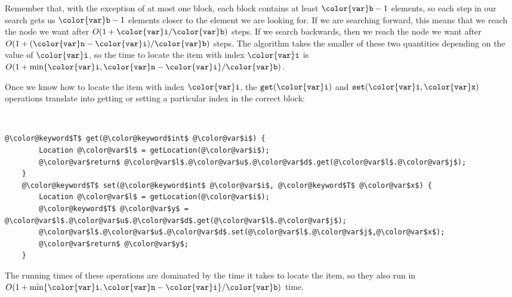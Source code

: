 \documentclass[10pt]{book}
\theoremstyle{plain}
\theoremstyle{definition}
\begin{document}
Remember that, with the exception of at most one block, each block
contains at least $\ensuremath{\mathtt{{\color{var}b}}}-1$ elements, so each step in our search gets
us $\ensuremath{\mathtt{{\color{var}b}}}-1$ elements closer to the element we are looking for.  If we
are searching forward, this means that we reach the node we want after
$O(1+\ensuremath{\mathtt{{\color{var}i}}}/\ensuremath{\mathtt{{\color{var}b}}})$ steps.  If we search backwards, then we reach the node we
want after $O(1+(\ensuremath{\mathtt{{\color{var}n}}}-\ensuremath{\mathtt{{\color{var}i}}})/\ensuremath{\mathtt{{\color{var}b}}})$ steps.  The algorithm takes the smaller
of these two quantities depending on the value of \ensuremath{\mathtt{{\color{var}i}}}, so the time to
locate the item with index \ensuremath{\mathtt{{\color{var}i}}} is $O(1+\min\{\ensuremath{\mathtt{{\color{var}i}}},\ensuremath{\mathtt{{\color{var}n}}}-\ensuremath{\mathtt{{\color{var}i}}}\}/\ensuremath{\mathtt{{\color{var}b}}})$.

Once we know how to locate the item with index \ensuremath{\mathtt{{\color{var}i}}}, the \ensuremath{\mathtt{get({\color{var}i})}} and
\ensuremath{\mathtt{set({\color{var}i},{\color{var}x})}} operations translate into getting or setting a particular
index in the correct block:



 \ \vspace{.5ex}\begin{Verbatim}[gobble=1,tabsize=2,frame=single,framerule=1.2pt,commandchars=\\@\$,label=\texttt{SEList},labelposition=topline]
	@\color@keyword$T$ get(@\color@keyword$int$ @\color@var$i$) {
		Location @\color@var$l$ = getLocation(@\color@var$i$);
		@\color@var$return$ @\color@var$l$.@\color@var$u$.@\color@var$d$.get(@\color@var$l$.@\color@var$j$);
	}
	@\color@keyword$T$ set(@\color@keyword$int$ @\color@var$i$, @\color@keyword$T$ @\color@var$x$) {
		Location @\color@var$l$ = getLocation(@\color@var$i$);
		@\color@keyword$T$ @\color@var$y$ = @\color@var$l$.@\color@var$u$.@\color@var$d$.get(@\color@var$l$.@\color@var$j$);
		@\color@var$l$.@\color@var$u$.@\color@var$d$.set(@\color@var$l$.@\color@var$j$,@\color@var$x$);
		@\color@var$return$ @\color@var$y$;
	}
\end{Verbatim}


The running times of these operations are dominated by the time it takes
to locate the item, so they also run in $O(1+\min\{\ensuremath{\mathtt{{\color{var}i}}},\ensuremath{\mathtt{{\color{var}n}}}-\ensuremath{\mathtt{{\color{var}i}}}\}/\ensuremath{\mathtt{{\color{var}b}}})$
time.
\end{document}
